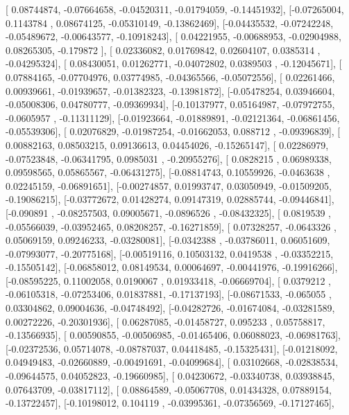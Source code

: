 \documentclass{article}
\begin{document}
       [ 0.08744874, -0.07664658, -0.04520311, -0.01794059, -0.14451932],
       [-0.07265004,  0.1143784 ,  0.08674125, -0.05310149, -0.13862469],
       [-0.04435532, -0.07242248, -0.05489672, -0.00643577, -0.10918243],
       [ 0.04221955, -0.00688953, -0.02904988,  0.08265305, -0.179872  ],
       [ 0.02336082,  0.01769842,  0.02604107,  0.0385314 , -0.04295324],
       [ 0.08430051,  0.01262771, -0.04072802,  0.0389503 , -0.12045671],
       [ 0.07884165, -0.07704976,  0.03774985, -0.04365566, -0.05072556],
       [ 0.02261466,  0.00939661, -0.01939657, -0.01382323, -0.13981872],
       [-0.05478254,  0.03946604, -0.05008306,  0.04780777, -0.09369934],
       [-0.10137977,  0.05164987, -0.07972755, -0.0605957 , -0.11311129],
       [-0.01923664, -0.01889891, -0.02121364, -0.06861456, -0.05539306],
       [ 0.02076829, -0.01987254, -0.01662053,  0.088712  , -0.09396839],
       [ 0.00882163,  0.08503215,  0.09136613,  0.04454026, -0.15265147],
       [ 0.02286979, -0.07523848, -0.06341795,  0.0985031 , -0.20955276],
       [ 0.0828215 ,  0.06989338,  0.09598565,  0.05865567, -0.06431275],
       [-0.08814743,  0.10559926, -0.0463638 ,  0.02245159, -0.06891651],
       [-0.00274857,  0.01993747,  0.03050949, -0.01509205, -0.19086215],
       [-0.03772672,  0.01428274,  0.09147319,  0.02885744, -0.09446841],
       [-0.090891  , -0.08257503,  0.09005671, -0.0896526 , -0.08432325],
       [ 0.0819539 , -0.05566039, -0.03952465,  0.08208257, -0.16271859],
       [ 0.07328257, -0.0643326 ,  0.05069159,  0.09246233, -0.03280081],
       [-0.0342388 , -0.03786011,  0.06051609, -0.07993077, -0.20775168],
       [-0.00519116,  0.10503132,  0.0419538 , -0.03352215, -0.15505142],
       [-0.06858012,  0.08149534,  0.00064697, -0.00441976, -0.19916266],
       [-0.08595225,  0.11002058,  0.0190067 ,  0.01933418, -0.06669704],
       [ 0.0379212 , -0.06105318, -0.07253406,  0.01837881, -0.17137193],
       [-0.08671533, -0.065055  ,  0.03304862,  0.09004636, -0.04748492],
       [-0.04282726, -0.01674084, -0.03281589,  0.00272226, -0.20301936],
       [ 0.06287085, -0.01458727,  0.095233  ,  0.05758817, -0.13566935],
       [ 0.00590855, -0.00506985, -0.01465406,  0.06088023, -0.06981763],
       [-0.02372536,  0.05714078, -0.08787037,  0.04418485, -0.15325431],
       [-0.01218092,  0.04949483, -0.02660889, -0.00491691, -0.04099684],
       [ 0.03102668, -0.02838534, -0.09644575,  0.04052823, -0.19660985],
       [ 0.04230672, -0.03340738,  0.03938845,  0.07643709, -0.03817112],
       [ 0.08864589, -0.05067708,  0.01434328,  0.07889154, -0.13722457],
       [-0.10198012,  0.104119  , -0.03995361, -0.07356569, -0.17127465],
\end{document}
